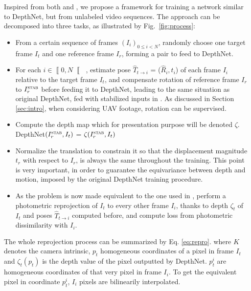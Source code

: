 \documentclass[runningheads]{llncs}
\begin{document}
Inspired from both \cite{zhou2017unsupervised} and \cite{isprs-annals-IV-2-W3-67-2017}, we propose a framework for training a network similar to DepthNet, but from unlabeled video sequences. The approach can be decomposed into three tasks, as illustrated by Fig.~\ref{fig:process}:
\begin{itemize}
\item From a certain sequence of frames $(I_i)_{0 \leq i < N}$, randomly choose one target frame $I_t$ and one reference frame 
$I_r$, forming a pair to feed to DepthNet.
\item For each $i \in \left\llbracket 0,N \right\llbracket$ , estimate pose $\widehat{T}_{t\rightarrow i}$ = ($\widehat{R}_i, t_i$) of each frame $I_i$ relative to the target frame $I_t$, and compensate rotation of reference frame $I_r$ to $I^\textsc{stab}_r$ before feeding it to DepthNet, leading to the same situation as original DepthNet, fed with stabilized inputs in \cite{isprs-annals-IV-2-W3-67-2017}. As discussed in Section
\ref{sec:intro}, when considering UAV footage, rotation can be supervised.
\item Compute the depth map which for presentation purpose will be 
denoted
$\zeta$. DepthNet$(I^\textsc{stab}_r, I_t)$ = $\zeta(I^\textsc{stab}_r, I_t)$
\item 
Normalize the translation
to constrain it so that the displacement magnitude $t_r$ with respect to $I_r$, is always the same throughout the training. This point is very important, 
in order to guarantee the
equivariance between depth and motion, 
imposed by the original DepthNet training procedure.
\item As the problem is now made equivalent to the one used in \cite{zhou2017unsupervised}, perform a photometric reprojection of $I_t$ to every other frame $I_i$, thanks to depth $\zeta_t$ of $I_t$ and poses $\widehat{T}_{t \rightarrow i}$ computed before, and compute loss from photometric dissimilarity with $I_i$.
\end{itemize}

The whole reprojection process can be summarized by Eq. \ref{eq:repro}. where $K$ denotes the camera intrinsic, $p_t$ homogeneous coordinates of a pixel in frame $I_t$ and $\zeta_t(p_t)$ is the depth value of the pixel outputted by DepthNet. $p^i_t$ are homogeneous coordinates of that very pixel in frame $I_i$. To get the equivalent pixel in coordinate $p^i_t$, 
$I_i$ pixels are bilinearily interpolated.
\end{document}
